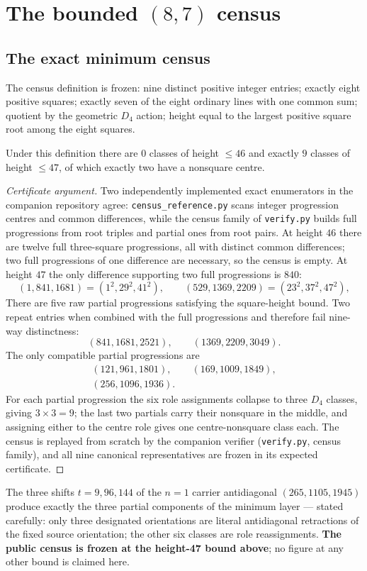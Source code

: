 \appendix

\section{The bounded $(8,7)$ census}\label{app:census}

\subsection{The exact minimum census}

The census definition is frozen: nine distinct positive integer entries;
exactly eight positive squares; exactly seven of the eight ordinary lines
with one common sum; quotient by the geometric $D_4$ action; height equal
to the largest positive square root among the eight squares.

\begin{proposition}\label{prop:census}
Under this definition there are $0$ classes of height $\le46$ and exactly
$9$ classes of height $\le47$, of which exactly two have a nonsquare
centre.
\end{proposition}

\begin{proof}[Certificate argument]
Two independently implemented exact enumerators in the companion repository
agree: \texttt{census\_reference.py} scans integer progression centres and
common differences, while the census family of \texttt{verify.py} builds
full progressions from root triples and partial ones from root pairs. At
height $46$ there are
twelve full three-square progressions, all with distinct common
differences; two full progressions of one difference are necessary, so the
census is empty. At height $47$ the only difference supporting two full
progressions is $840$:
\[
(1,841,1681)=(1^2,29^2,41^2),\qquad(529,1369,2209)=(23^2,37^2,47^2),
\]
There are five raw partial progressions satisfying the square-height bound.
Two repeat entries when combined with the full progressions and therefore
fail nine-way distinctness:
\[
(841,1681,2521),\qquad (1369,2209,3049).
\]
The only compatible partial progressions are
\[
\begin{gathered}
(121,961,1801),\qquad(169,1009,1849),\\
(256,1096,1936).
\end{gathered}
\]
For each partial progression the six
role assignments collapse to three $D_4$ classes, giving $3\times3=9$; the
last two partials carry their nonsquare in the middle, and assigning either
to the centre role gives one centre-nonsquare class each. The census is
replayed from scratch by the companion verifier (\texttt{verify.py},
census family), and all nine canonical representatives are frozen in its
expected certificate.
\end{proof}

The three shifts $t=9,96,144$ of the $n=1$ carrier antidiagonal
$(265,1105,1945)$ produce exactly the three partial components of the
minimum layer --- stated carefully: only three designated orientations are
literal antidiagonal retractions of the fixed source orientation; the other
six classes are role reassignments. \textbf{The public census is frozen at
the height-47 bound above}; no figure at any other bound is claimed here.
